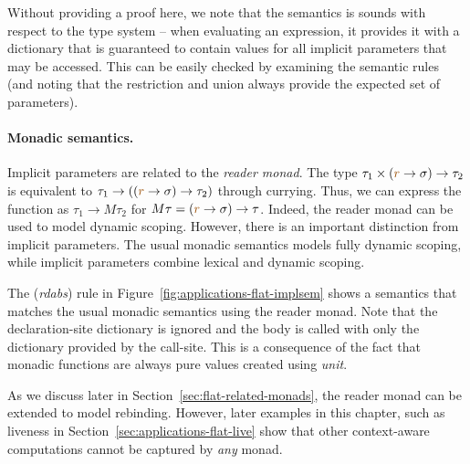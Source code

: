 Without providing a proof here, we note that the semantics is sounds with respect to the type 
system -- when evaluating an expression, it provides it with a dictionary that is guaranteed to
contain values for all implicit parameters that may be accessed. This can be easily checked by
examining the semantic rules (and noting that the restriction and union always provide the
expected set of parameters).

\paragraph{Monadic semantics.}
Implicit parameters are related to the \emph{reader mo\-nad}. The type 
$\tau_1 \times (\aclrd{r} \rightarrow \sigma) \rightarrow \tau_2$ is equivalent to
$\tau_1 \rightarrow ((\aclrd{r} \rightarrow \sigma) \rightarrow \tau_2)$ through currying. Thus, we can
express the function as $\tau_1 \rightarrow M\tau_2$ for $M\tau = (\aclrd{r} \rightarrow \sigma) \rightarrow \tau$.
Indeed, the reader monad can be used to model dynamic scoping. However, there is an important distinction
from implicit parameters. The usual monadic semantics models fully dynamic scoping, while implicit
parameters combine lexical and dynamic scoping.

The (\emph{rdabs}) rule in Figure~\ref{fig:applications-flat-implsem} shows a semantics that
matches the usual monadic semantics using the reader monad. Note that the declaration-site dictionary
is ignored and the body is called with only the dictionary provided by the call-site. This is
a consequence of the fact that monadic functions are always pure values created using \emph{unit}.

As we discuss later in Section~\ref{sec:flat-related-monads}, the reader monad can be extended 
to model rebinding. However, later examples in this chapter, such as liveness in 
Section~\ref{sec:applications-flat-live} show that other context-aware computations 
cannot be captured by \emph{any} monad.


